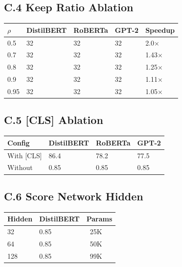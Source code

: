 \subsection{C.4 Keep Ratio Ablation}

\begin{table}[H]
\centering
\small
\begin{tabular}{lllll}
\toprule
\textbf{$\rho$} & \textbf{DistilBERT} & \textbf{RoBERTa} & \textbf{GPT-2} & \textbf{Speedup} \\
\midrule
0.5 & 32 & 32 & 32 & 2.0$\times$ \\
0.7 & 32 & 32 & 32 & 1.43$\times$ \\
0.8 & 32 & 32 & 32 & 1.25$\times$ \\
0.9 & 32 & 32 & 32 & 1.11$\times$ \\
0.95 & 32 & 32 & 32 & 1.05$\times$ \\
\bottomrule
\end{tabular}
\end{table}

\subsection{C.5 [CLS] Ablation}

\begin{table}[H]
\centering
\small
\begin{tabular}{llll}
\toprule
\textbf{Config} & \textbf{DistilBERT} & \textbf{RoBERTa} & \textbf{GPT-2} \\
\midrule
With [CLS] & 86.4 & 78.2 & 77.5 \\
Without & 0.85 & 0.85 & 0.85 \\
\bottomrule
\end{tabular}
\end{table}

\subsection{C.6 Score Network Hidden}

\begin{table}[H]
\centering
\small
\begin{tabular}{lll}
\toprule
\textbf{Hidden} & \textbf{DistilBERT} & \textbf{Params} \\
\midrule
32 & 0.85 & ~25K \\
64 & 0.85 & ~50K \\
128 & 0.85 & ~99K \\
\bottomrule
\end{tabular}
\end{table}

